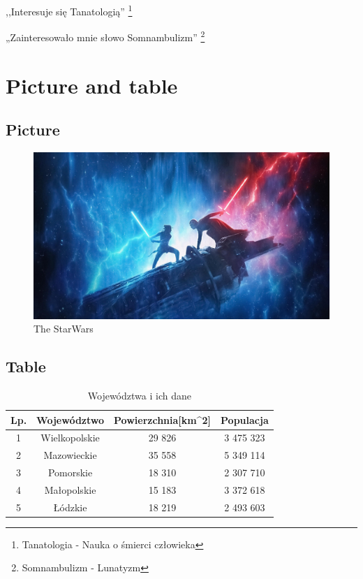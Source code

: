 \documentclass{article}
\begin{document}
,,Interesuje się Tanatologią''
\footnote{Tanatologia - Nauka o śmierci człowieka}
\newline

„Zainteresowało mnie słowo Somnambulizm”
\footnote{Somnambulizm - Lunatyzm}

\newpage
\section{Picture and table}
\subsection{Picture}

\label{fig:StarWars}
\begin{figure}[h!]
\centering
\includegraphics[scale=0.1]{StarWars.jpg}
\caption{The StarWars}
\end{figure}

\subsection{Table}

\label{table:1}
\begin{table}[h!]
\centering
\begin{tabular}{||c c c c||} 
 \hline
 Lp. & Województwo & Powierzchnia[km^{2}] & Populacja \\ [0.5ex] 
 \hline\hline
 1 & Wielkopolskie & 29 826 & 3 475 323 \\ 
 \hline
 2 & Mazowieckie & 35 558 & 5 349 114 \\
 \hline
 3 & Pomorskie & 18 310 & 2 307 710 \\
 \hline
 4 & Małopolskie & 15 183 & 3 372 618 \\
 \hline
 5 & Łódzkie & 18 219 & 2 493 603 \\ [1ex] 
 \hline
\end{tabular}
\caption{Województwa i ich dane}
\end{table}
\end{document}
